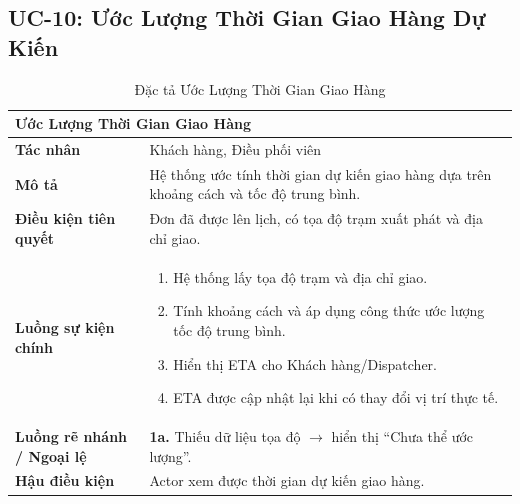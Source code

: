 \subsection{UC-10: Ước Lượng Thời Gian Giao Hàng Dự Kiến}
\begin{table}[H]
  \centering
  \begin{tabularx}{\textwidth}{|l|X|}
    \hline
    \multicolumn{2}{|l|}{\textbf{Ước Lượng Thời Gian Giao Hàng}} \\
    \hline
    \textbf{Tác nhân}           & Khách hàng, Điều phối viên \\ \hline
    \textbf{Mô tả}              & Hệ thống ước tính thời gian dự kiến giao hàng dựa trên khoảng cách và tốc độ trung bình. \\ \hline
    \textbf{Điều kiện tiên quyết} & Đơn đã được lên lịch, có tọa độ trạm xuất phát và địa chỉ giao. \\ \hline
    \textbf{Luồng sự kiện chính} &
      \begin{enumerate}[leftmargin=*, nosep, topsep=0pt]
        \item Hệ thống lấy tọa độ trạm và địa chỉ giao.
        \item Tính khoảng cách và áp dụng công thức ước lượng tốc độ trung bình.
        \item Hiển thị ETA cho Khách hàng/Dispatcher.
        \item ETA được cập nhật lại khi có thay đổi vị trí thực tế.
      \end{enumerate} \\ \hline
    \textbf{Luồng rẽ nhánh / Ngoại lệ} &
      \textbf{1a.} Thiếu dữ liệu tọa độ $\rightarrow$ hiển thị ``Chưa thể ước lượng''. \\ \hline
    \textbf{Hậu điều kiện}      & Actor xem được thời gian dự kiến giao hàng. \\
    \hline
  \end{tabularx}
  \caption{Đặc tả Ước Lượng Thời Gian Giao Hàng}
  \label{tab:uc10}
\end{table}

